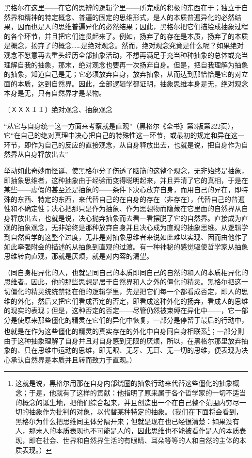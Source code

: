 \documentclass[a4paper,twoside,12pt,AutoFakeBold]{ctexart}
\begin{document}
黑格尔在这里——在它的思辨的逻辑学里——所完成的积极的东西在于；独立于自然界和精神的特定概念、普遍的固定的思维形式，是人的本质普遍异化的必然结果，因而也是人的思维普遍异化的必然结果；因此，黑格尔把它们描绘成抽象过程的各个环节，并且把它们连贯起来了。例如，扬弃了的存在是本质，扬弃了的本质是概念，扬弃了的概念……是绝对观念。然而，绝对观念究竟是什么呢？如果绝对观念不愿意再去重头经历全部抽象活动，不想再满足于充当种种抽象的总体或充当理解自我的抽象，那末，绝对观念也要再一次扬弃自身。但是，把自我理解为抽象的抽象，知道自己是无；它必须放弃自身，放弃抽象，从而达到那恰恰是它的对立面的本质，达到自然界。因此，全部逻辑学都证明，抽象思维本身是无，绝对观念本身是无，只有自然界才是某物。

〔ＸＸＸＩＩ〕绝对观念、抽象观念

\begin{fangsong}
“从它与自身统一这一方面来考察就是直观”（黑格尔《全书》第3版第222页），它“在自己的绝对真理中决心把自己的特殊性这一环节，或最初的规定和异在这一环节，即作为自己的反应的直接观念，从自身释放出去，也就是说，把自身作为自然界从自身释放出去”
\end{fangsong}

举动如此奇妙而怪诞、使黑格尔分子伤透了脑筋的这整个观念，无非始终是抽象，即抽象思维者，这种抽象由于经验而变得聪明起来，并且弄清了它的真相，于是在某些——虚假的甚至还是抽象的——条件下决心放弃自身，而用自己的异在，即特殊的东西、特定的东西，来代替自己的在自身的存在（非存在），代替自己的普遍性和不确定性；决心把那只是作为抽象、作为思想物而隐藏在它里面的自然界从自身释放出去，也就是说，决心抛弃抽象而去看一看摆脱了它的自然界。直接成为直观的抽象观念，无非始终是那种放弃自身并且决心成为直观的抽象思维。从逻辑学到自然哲学的这整个过度，无非是对抽象思维者来说如此难以实现、因而由他作了如此牵强附会的描述的从抽象到直观的过渡。有一种神秘的感觉驱使哲学家从抽象思维转向直观，那就是厌烦，就是对内容的渴望。

（同自身相异化的人，也就是同自己的本质即同自己的自然的和人的本质相异化的思维者。因此，他的那些思想是居于自然界和人之外的僵化的精灵。黑格尔把这一切僵化的精灵统统禁锢在他的逻辑学里，先是把它们每一个都看成否定，即人的思维的外化，然后又把它们看成否定的否定，即看成这种外化的扬弃，看成人的思维的现实的表现；但是，这种否定的否定——尽管仍然被束缚在异化中——，它一部分是使原来那些僵化的精灵在它们的异化中恢复，一部分是停留于最后的行动中，也就是在作为这些僵化的精灵的真实存在的外化中自身同自身相联系\footnote{这就是说，黑格尔用那在自身内部绕圈的抽象行动来代替这些僵化的抽象概念；于是，他就有了这样的贡献：他指明了原来属于各个哲学家的一切不适当的概念的诞生地，把他们综合起来，并且创造出一个在自己整个范围内穷尽一切的抽象作为批判的对象，以代替某种特定的抽象。（我们在下面将会看到，黑格尔为什么把思维同主体分隔开来；但就是现在也已经很清楚：如果没有人，那末人的本质表现也不可能是人的，因此思维也不能被看作是人的本质表现，即在社会、世界和自然界生活的有眼睛、耳朵等等的人和自然的主体的本质表现。）
}；一部分则由于这种抽象理解了自身并且对自身感到无限的厌烦，所以，在黑格尔那里放弃抽象的、只在思维中运动的思维，即无眼、无牙、无耳、无一切的思维，便表现为决心承认自然界是本质并且转而致力于直观。）
\end{document}
